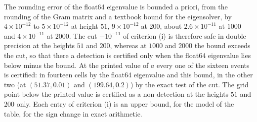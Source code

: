 The rounding error of the float64 eigenvalue is bounded a priori, from the rounding of the Gram matrix and a textbook bound for the eigensolver, by $4\times10^{-12}$ to $5\times10^{-12}$ at height $51$, $9\times10^{-12}$ at $200$, about $2.6\times10^{-11}$ at $1000$ and $4\times10^{-11}$ at $2000$. The cut $-10^{-11}$ of criterion (i) is therefore safe in double precision at the heights $51$ and $200$, whereas at $1000$ and $2000$ the bound exceeds the cut, so that there a detection is certified only when the float64 eigenvalue lies below minus the bound. At the printed value of $a$ every one of the sixteen events is certified: in fourteen cells by the float64 eigenvalue and this bound, in the other two (at $(51.37,0.01)$ and $(199.64,0.2)$) by the exact test of the cut. The grid point below the printed value is certified as a non detection at the heights $51$ and $200$ only. Each entry of criterion (i) is an upper bound, for the model of the table, for the sign change in exact arithmetic.


